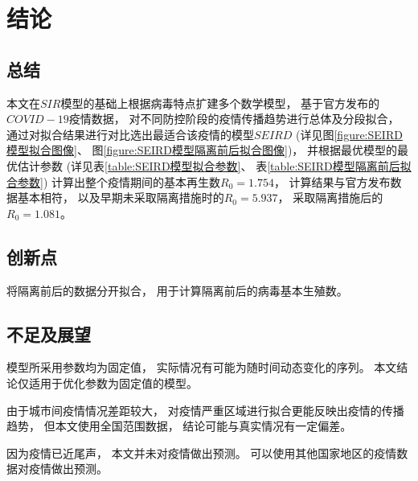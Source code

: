 \section{结论}
\subsection{总结}
\par 本文在$SIR$模型的基础上根据病毒特点扩建多个数学模型，
基于官方发布的$COVID-19$疫情数据，
对不同防控阶段的疫情传播趋势进行总体及分段拟合，
通过对拟合结果进行对比选出最适合该疫情的模型$SEIRD$
(详见图\ref{figure:SEIRD模型拟合图像}、
图\ref{figure:SEIRD模型隔离前后拟合图像})，
并根据最优模型的最优估计参数
(详见表\ref{table:SEIRD模型拟合参数}、
表\ref{table:SEIRD模型隔离前后拟合参数})
计算出整个疫情期间的基本再生数$R_0=1.754$，
计算结果与官方发布数据基本相符，
以及早期未采取隔离措施时的$R_0=5.937$，
采取隔离措施后的$R_0=1.081$。
\subsection{创新点}
\par 将隔离前后的数据分开拟合，
用于计算隔离前后的病毒基本生殖数。
\subsection{不足及展望}
\par 模型所采用参数均为固定值，
实际情况有可能为随时间动态变化的序列。
本文结论仅适用于优化参数为固定值的模型。
\par 由于城市间疫情情况差距较大，
对疫情严重区域进行拟合更能反映出疫情的传播趋势，
但本文使用全国范围数据，
结论可能与真实情况有一定偏差。
\par 因为疫情已近尾声，
本文并未对疫情做出预测。
可以使用其他国家地区的疫情数据对疫情做出预测。